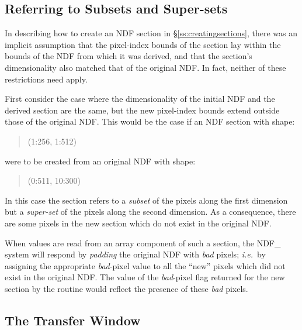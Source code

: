 \documentclass[twoside,11pt,nolof]{starlink}
\providecommand{\st}[1]{{\emph{#1}}}
\begin{document}
\subsection{\label{ss:selectingsupersets}Referring to Subsets and Super-sets}

In describing how to create an NDF section in \S\ref{ss:creatingsections},
there was an implicit assumption that the pixel-index bounds of the section
lay within the bounds of the NDF from which it was derived, and that the
section's dimensionality also matched that of the original NDF.
In fact, neither of these restrictions need apply.

First consider the case where the dimensionality of the initial NDF and the
derived section are the same, but the new pixel-index bounds extend outside
those of the original NDF.
This would be the case if an NDF section with shape:

\small
\begin{quote}
\begin{center}
(1:256, 1:512)
\end{center}
\end{quote}
\normalsize

were to be created from an original NDF with shape:

\small
\begin{quote}
\begin{center}
(0:511, 10:300)
\end{center}
\end{quote}
\normalsize

In this case the section refers to a \st{subset\/} of the pixels along the
first dimension but a \st{super-set\/} of the pixels along the second
dimension.
As a consequence, there are some pixels in the new section which do not
exist in the original NDF.

When values are read from an array component of such a section, the NDF\_
system will respond by \st{padding\/} the original NDF with \st{bad\/} pixels;
\st{i.e.}\ by assigning the appropriate \st{bad\/}-pixel value to all the
``new'' pixels which did not exist in the original NDF.
The value of the \st{bad\/}-pixel flag returned for the new section by the
routine  would reflect the presence of these \st{bad\/} pixels.

\subsection{The Transfer Window}
\end{document}
